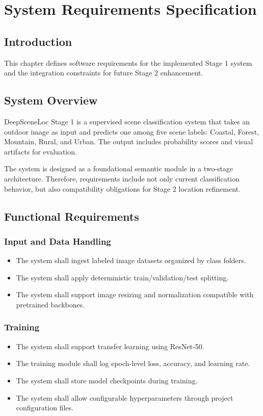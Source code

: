 \chapter{System Requirements Specification}

\section{Introduction}
This chapter defines software requirements for the implemented Stage 1 system and the integration constraints for future Stage 2 enhancement.

\section{System Overview}
DeepSceneLoc Stage 1 is a supervised scene classification system that takes an outdoor image as input and predicts one among five scene labels: Coastal, Forest, Mountain, Rural, and Urban. The output includes probability scores and visual artifacts for evaluation.

The system is designed as a foundational semantic module in a two-stage architecture. Therefore, requirements include not only current classification behavior, but also compatibility obligations for Stage 2 location refinement.

\section{Functional Requirements}
\subsection{Input and Data Handling}
\begin{itemize}
\item The system shall ingest labeled image datasets organized by class folders.
\item The system shall apply deterministic train/validation/test splitting.
\item The system shall support image resizing and normalization compatible with pretrained backbones.
\end{itemize}

\subsection{Training}
\begin{itemize}
\item The system shall support transfer learning using ResNet-50.
\item The training module shall log epoch-level loss, accuracy, and learning rate.
\item The system shall store model checkpoints during training.
\item The system shall allow configurable hyperparameters through project configuration files.
\end{itemize}

